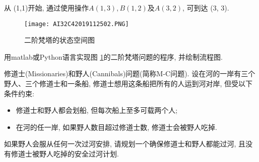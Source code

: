 \begin{example}
从 (1,1)开始, 通过使用操作$A(1, 3),B(1, 2)$及$A(3, 2)$, 可到达 (3, 3).
\begin{figure}[H]
\centering
\texttt{[image: AI32C42019112502.PNG]}
\caption{二阶梵塔的状态空间图}
\label{AI32fig2019120223}
\end{figure}
\end{example}
\begin{think}
    用matlab或Python语言实现图 \ref{AI32fig2019120223}的二阶梵塔问题的程序, 并绘制流程图.
\end{think}
\begin{example}
  修道士(Missionaries)和野人(Cannibals)问题(简称M-C问题). 设在河的一岸有三个野人、三个修道士和一条船, 修道士想用这条船把所有的人运到河对岸, 但受以下条件约束:
\begin{itemize}
\item 修道士和野人都会划船, 但每次船上至多可载两个人;
\item 在河的任一岸, 如果野人数目超过修道士数, 修道士会被野人吃掉.
\end{itemize}

如果野人会服从任何一次过河安排, 请规划一个确保修道士和野人都能过河, 且没有修道士被野人吃掉的安全过河计划.
\end{example}
